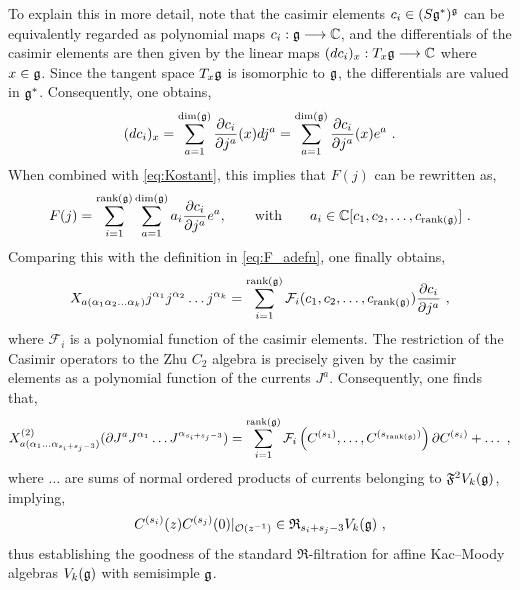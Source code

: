 To explain this in more detail, note that the casimir elements $c_i \in (S\mathfrak{g}^*)^{\mathfrak{g}}$ can be equivalently regarded as polynomial maps $c_i : \mathfrak{g} \longrightarrow \mathbb{C}$, and the differentials of the casimir elements are then given by the linear maps $(dc_i)_x : T_{x} \mathfrak{g} \longrightarrow \mathbb{C}$ where $x \in \mathfrak{g}$. Since the tangent space $T_{x} \mathfrak{g}$ is isomorphic to $\mathfrak{g}$, the differentials are valued in $\mathfrak{g}^*$. Consequently, one obtains,
\begin{equation}
    (dc_i)_x = \sum_{a = 1}^{\mathrm{dim}(\mathfrak{g})} \frac{\partial c_i}{\partial j^a} (x) dj^a = \sum_{a = 1}^{\mathrm{dim}(\mathfrak{g})} \frac{\partial c_i}{\partial j^a} (x) e^a~. 
\end{equation}
When combined with \eqref{eq:Kostant}, this implies that $F(j)$ can be rewritten as,
\begin{equation}
    F(j) = \sum_{i=1}^{\mathrm{rank}(\mathfrak{g})}\sum_{a = 1}^{\mathrm{dim}(\mathfrak{g})} a_i \frac{\partial c_i}{\partial j^a} e^a,  \qquad \mathrm{with} \qquad a_i \in \mathbb{C}[c_1, c_2, \ldots, c_{\mathrm{rank}(\mathfrak{g})}]~.
\end{equation}
Comparing this with the definition in \eqref{eq:F_adefn}, one finally obtains,
\begin{equation}
    X_{a(\alpha_1 \alpha_2 \ldots \alpha_k)} j^{\alpha_1} j^{\alpha_2} \ldots j^{\alpha_k} = \sum_{i=1}^{\mathrm{rank}(\mathfrak{g})} \mathcal{F}_i(c_1,c_2,\ldots, c_{\mathrm{rank}(\mathfrak{g})}) \frac{\partial c_i}{\partial j^a}~,
\end{equation}
where $\mathcal{F}_i$ is a polynomial function of the casimir elements. The restriction of the Casimir operators to the Zhu $C_2$ algebra is precisely given by the casimir elements as a polynomial function of the currents $J^a$. Consequently, one finds that,
\begin{equation}
    X^{(2)}_{a (\alpha_1 \ldots \alpha_{s_i+s_j-3})} (\partial J^aJ^{\alpha_1} \ldots J^{\alpha_{s_i+s_j-3}}) = \sum_{i=1}^{\mathrm{rank}(\mathfrak{g})} \mathcal{F}_i\left(C^{(s_1)},\ldots, C^{(s_{\mathrm{rank}(\mathfrak{g})})}\right) \partial C^{(s_i)} + \ldots~,
\end{equation}
where $\ldots$ are sums of normal ordered products of currents belonging to $\mathfrak{F}^2V_k(\mathfrak{g})$, implying,
\begin{equation}
    C^{(s_i)}(z) C^{(s_j)}(0)|_{\mathcal{O}(z^{-1})} \in \mathfrak{R}_{s_i+s_j-3} V_k(\mathfrak{g})~,
\end{equation}
thus establishing the goodness of the standard $\mathfrak{R}$-filtration for affine Kac--Moody algebras $V_k(\mathfrak{g})$ with semisimple $\mathfrak{g}$. 

